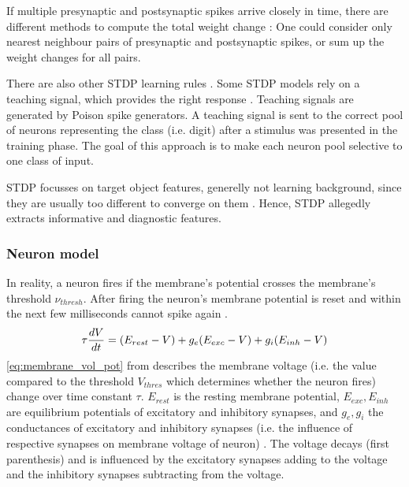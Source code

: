 If multiple presynaptic and postsynaptic spikes arrive closely in time, there are different methods to compute the total weight change \cite{simulation_STDP}:
One could consider only nearest neighbour pairs of presynaptic and postsynaptic spikes, or sum up the weight changes for all pairs.

There are also other \ac{STDP} learning rules \cite{SNN}.
Some \ac{STDP} models rely on a teaching signal, which provides the right response \cite{STDP_like}.
Teaching signals are generated by Poison spike generators.
A teaching signal is sent to the correct pool of neurons representing the class (i.e. digit) after a stimulus was presented in the training phase.
The goal of this approach is to make each neuron pool selective to one class of input.

\ac{STDP} focusses on target object features, generelly not learning background, since they are usually too different to converge on them \cite{multi_scale_STDP}.
Hence, \ac{STDP} allegedly extracts informative and diagnostic features.


\subsubsection{Neuron model}
\label{subsubsec:neuron_model}
In reality, a neuron fires if the membrane's potential crosses the membrane's threshold $\nu_{thresh}$.
After firing the neuron's membrane potential is reset and within the next few milliseconds cannot spike again \cite{SNN}.
%
\begin{equation}
    \centering
    \label{eq:membrane_vol_pot}
    \tau \frac{dV}{dt} = (E_{rest} - V) + g_e(E_{exc} - V) + g_i(E_{inh} - V)
\end{equation}
%
\autoref{eq:membrane_vol_pot} from \cite{SNN} describes the membrane voltage 
(i.e. the value compared to the threshold $V_{thres}$ which determines whether the neuron fires) change over time constant $\tau$.
$E_{rest}$ is the resting membrane potential, $E_{exc}, E_{inh}$ are equilibrium potentials of excitatory and inhibitory synapses, 
and $g_e, g_i$ the conductances of excitatory and inhibitory synapses (i.e. the influence of respective synapses on membrane voltage of neuron) \cite{SNN}. 
The voltage decays (first parenthesis) and is influenced by the excitatory synapses 
adding to the voltage and the inhibitory synapses subtracting from the voltage.


